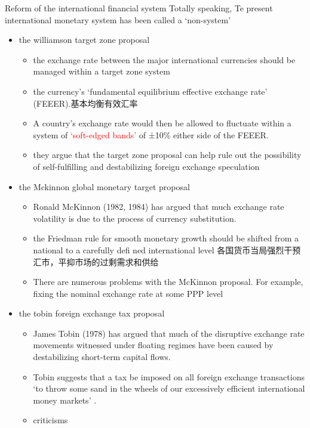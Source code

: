 \documentclass[10pt,hyperref={CJKbookmarks=true},xcolor=dvipsnames,aspectratio=169]{beamer}
\begin{document}
\begin{frame}[allowframebreaks]{Reform of the international financial system}
Totally speaking, Te present international monetary system has been called a ‘non-system’ 
	\begin{itemize}
		\item the williamson target zone proposal
		\begin{itemize}
			\item the exchange rate between the major international currencies should be managed within a target zone system
			\item the currency’s ‘fundamental equilibrium effective exchange rate’ (FEEER).基本均衡有效汇率
			\item  A country’s exchange rate would then be allowed to fluctuate within
			a system of \textcolor{red}{‘soft-edged bands’} of ±10\% either side of the FEEER.
			\item they argue that the target zone proposal can	help rule out the possibility of self-fulfilling and destabilizing foreign exchange speculation
		\end{itemize}
		\item the Mckinnon global monetary target proposal
				\begin{itemize}
			\item Ronald McKinnon (1982, 1984) has argued that much exchange rate volatility is
			due to the process of currency substitution. 
			\item  the Friedman rule for smooth monetary growth should be shifted
			from a national to a carefully defi ned international level 各国货币当局强烈干预汇市，平抑市场的过剩需求和供给
			\item There are numerous problems with the McKinnon proposal. For example, fixing the nominal exchange rate at some PPP level
		\end{itemize}
		\item the tobin foreign exchange tax proposal
				\begin{itemize}
			\item James Tobin (1978) has argued that much of the disruptive exchange rate movements
			witnessed under floating regimes have been caused by destabilizing short-term capital flows. 
		\item Tobin suggests that a tax be imposed on all foreign exchange transactions ‘to throw some sand in the wheels of our excessively efficient international		money markets’ . 
		\item  criticisms
		\begin{itemize}

\end{itemize}
\end{itemize}
\end{itemize}
\end{frame}
\end{document}
